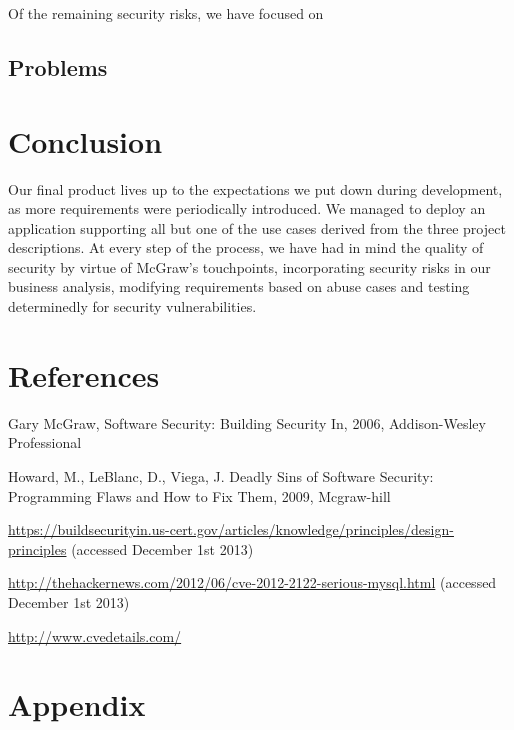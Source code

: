 \documentclass[a4paper]{article}
\begin{document}
Of the remaining security risks, we have focused on %

\subsection{Problems}


\section{Conclusion}
Our final product lives up to the expectations we put down during development, as more requirements were periodically introduced. We managed to deploy an application supporting all but one of the use cases derived from the three project descriptions. At every step of the process, we have had in mind the quality of security by virtue of McGraw's touchpoints\cite{McGraw2009}, incorporating security risks in our business analysis, modifying requirements based on abuse cases and testing determinedly for security vulnerabilities.


\newpage
\section{References}
\begin{thebibliography}{9}
Gary McGraw,
Software Security: Building Security In,
2006,
Addison-Wesley Professional 

Howard, M., LeBlanc, D., Viega, J.
Deadly Sins of Software Security: Programming Flaws and How to Fix Them,
2009,
Mcgraw-hill

\href{https://buildsecurityin.us-cert.gov/articles/knowledge/principles/design-principles}{https://buildsecurityin.us-cert.gov/articles/knowledge/principles/design-principles} (accessed December 1st 2013)

\href{http://thehackernews.com/2012/06/cve-2012-2122-serious-mysql.html}{http://thehackernews.com/2012/06/cve-2012-2122-serious-mysql.html} 
 (accessed December 1st 2013)
 
\href{http://www.cvedetails.com/}{http://www.cvedetails.com/}
\end{thebibliography}

\newpage
\section{Appendix}
\end{document}
